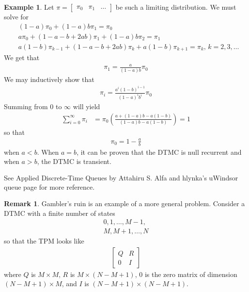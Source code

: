 \documentclass[11pt]{amsart}
\theoremstyle{definition}
\newtheorem{remark}[theorem]{Remark}
\newtheorem{example}[theorem]{Example}
\numberwithin{equation}{section}
\begin{document}
\begin{example}
     Let $\pi=\begin{bmatrix}
         \pi_0 & \pi_1 & \ldots
     \end{bmatrix}$ be such a limiting distribution. We must solve for
     \begin{align*}
         &(1-a)\pi_0+(1-a)b\pi_1=\pi_0\\
         &a\pi_0+(1-a-b+2ab)\pi_1+(1-a)b\pi_2=\pi_1\\
         &a(1-b)\pi_{k-1}+(1-a-b+2ab)\pi_k+a(1-b)\pi_{k+1}=\pi_k,\,k=2,3,\ldots
     \end{align*}
     We get that
     \begin{align*}
         \pi_1=\frac{a}{(1-a)b}\pi_0
     \end{align*}
     We may inductively show that
     \begin{align*}
         \pi_i=\frac{a^i(1-b)^{i-1}}{(1-a)^ib^i}\pi_0
     \end{align*}
     Summing from $0$ to $\infty$ will yield
     \begin{align*}
         \sum_{i=0}^\infty \pi_i&=\pi_0\left(\frac{a+(1-a)b-a(1-b)}{(1-a)b-a(1-b)}\right)=1
     \end{align*}
     so that
     \begin{align*}
         \pi_0=1-\frac{a}{b}
     \end{align*}
     when $a<b$. When $a=b$, it can be proven that the DTMC is null recurrent and when $a>b$, the DTMC is transient.

     See Applied Discrete-Time Queues by Attahiru S. Alfa and hlynka's uWindsor queue page for more reference.
 \end{example}
 \begin{remark}
     Gambler's ruin is an example of a more general problem. Consider a DTMC with a finite number of states
     \begin{align*}
         0,1,\ldots,M-1,\tag{transient states}\\
         M,M+1,\ldots,N\tag{absorbing states}
     \end{align*}
     so that the TPM looks like
     \begin{align*}
         \begin{bmatrix}
             Q & R\\
             0 & I
         \end{bmatrix}
     \end{align*}
     where $Q$ is $M\times M$, $R$ is $M\times (N-M+1)$, $0$ is the zero matrix of dimension $(N-M+1)\times M$, and $I$ is $(N-M+1)\times(N-M+1)$. 
 \end{remark}
\end{document}
